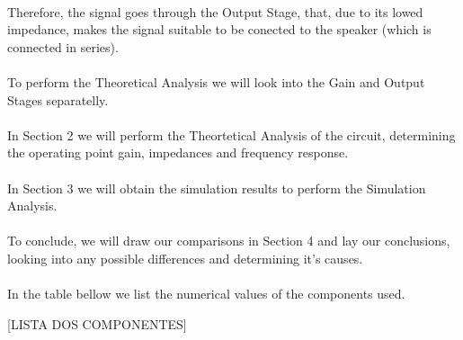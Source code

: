 \paragraph{} Therefore, the signal goes through the Output Stage, that, due to its lowed impedance, makes the signal suitable to be conected to the speaker (which is connected in series).

\paragraph{} To perform the Theoretical Analysis we will look into the Gain and Output Stages separatelly.

\paragraph{} In Section 2 we will perform the Theortetical Analysis of the circuit, determining the operating point gain, impedances and frequency response.

\paragraph{} In Section 3 we will obtain the simulation results to perform the Simulation Analysis.

\paragraph{} To conclude, we will draw our comparisons in Section 4 and lay our conclusions, looking into any possible differences and determining it's causes.

\paragraph{} In the table bellow we list the numerical values of the components used.

[LISTA DOS COMPONENTES]

\clearpage
